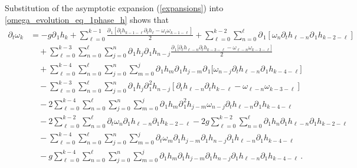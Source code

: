 \documentclass[11pt]{article}
\theoremstyle{plain}
\theoremstyle{definition}
\theoremstyle{definition}
\def\p{\text{\bf\emph{p}}}
\def\p{{\partial\hspace{1pt}}}
\begin{document}
Substitution of the asymptotic expansion (\ref{expansions}) into \eqref{omega_evolution_eq_1phase_h} shows that
\begin{align}
\partial_t \omega_k &= - g \p_{\!1} h_k + \sum_{\ell=0}^{k-1}\frac{\p_{\!1} \left[\partial_t h_{k-1-\ell}\partial_t h_{\ell}  - \omega_\ell\omega_{k-1-\ell}\right]}{2}+ \sum_{\ell=0}^{k-2}\sum_{n=0}^{\ell} \p_{\!1} \left[ \omega_n \partial_t h_{\ell-n} \p_{\!1} h_{k-2-\ell} \right]\nonumber\\
&\quad +\sum_{\ell=0}^{k-3}\sum_{n=0}^{\ell}\sum_{j=0}^n\p_{\!1} h_j\p_{\!1} h_{n-j}\frac{\p_{\!1} \big[ \partial_t h_{\ell-n}\partial_t h_{k-3-\ell}  - \omega_{\ell-n}\omega_{k-3-\ell} \big]}{2}\nonumber\\
&\quad +\sum_{\ell=0}^{k-4}\sum_{n=0}^{\ell}\sum_{j=0}^n\sum_{m=0}^{j}\p_{\!1} h_m\p_{\!1} h_{j-m}\p_{\!1} \big[ \omega_{n-j} \partial_t h_{\ell-n} \p_{\!1} h_{k-4-\ell} \big]\nonumber\\
&\quad -\sum_{\ell=0}^{k-3}\sum_{n=0}^{\ell}\sum_{j=0}^n\p_{\!1} h_j\p_{\!1}^2 h_{n-j}\left[\partial_t h_{\ell-n}\partial_t h_{k-\ell} -\omega_{\ell-n}\omega_{k-3-\ell} \right]\nonumber\\
&\quad -2\sum_{\ell=0}^{k-4}\sum_{n=0}^{\ell}\sum_{j=0}^n\sum_{m=0}^j\p_{\!1} h_m\p_{\!1}^2 h_{j-m}\omega_{n-j} \partial_t h_{\ell-n} \p_{\!1} h_{k-4-\ell}\nonumber\\
&\quad -2\sum_{\ell=0}^{k-2}\sum_{n=0}^{\ell}\partial_t\omega_n\partial_1 h_{\ell-n}\partial_1 h_{k-2-\ell} -2g\sum_{\ell=0}^{k-2}\sum_{n=0}^{\ell}\partial_1h_n\partial_1 h_{\ell-n}\partial_1 h_{k-2-\ell}\nonumber\\
&\quad -\sum_{\ell=0}^{k-4}\sum_{n=0}^{\ell}\sum_{j=0}^n\sum_{m=0}^j\partial_t\omega_m\partial_1 h_{j-m}\partial_1 h_{n-j}\partial_1 h_{\ell-n}\partial_1 h_{k-4-\ell}\nonumber\\
&\quad -g\sum_{\ell=0}^{k-4}\sum_{n=0}^{\ell}\sum_{j=0}^n\sum_{m=0}^j\partial_1h_m\partial_1 h_{j-m}\partial_1 h_{n-j}\partial_1 h_{\ell-n}\partial_1 h_{k-4-\ell}\,.\label{wk_ww}
\end{align}
\end{document}
